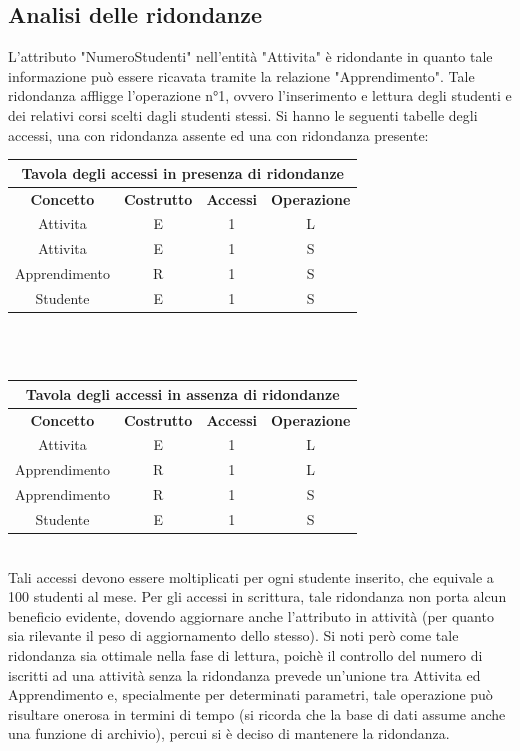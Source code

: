 \documentclass[11pt]{article}
\begin{document}
	\subsection{Analisi delle ridondanze}
		L'attributo "NumeroStudenti" nell'entità "Attivita" è ridondante in quanto tale informazione può essere ricavata tramite la relazione "Apprendimento".
		Tale ridondanza affligge l'operazione n°1, ovvero l'inserimento e lettura degli studenti e dei relativi corsi scelti dagli studenti stessi. Si hanno le seguenti tabelle degli accessi, una con ridondanza assente ed una con ridondanza presente:\\
		\begin{tabular}{|c|c|c|c|}
			\hline
			\multicolumn{4}{|c|}{Tavola degli accessi in presenza di ridondanze}\\
			\hline
			\textbf{Concetto} & \textbf{Costrutto} & \textbf{Accessi} &\textbf{Operazione}\\
			\hline
			Attivita&E&1&L\\
			\hline
			Attivita&E&1&S\\
			\hline
			Apprendimento&R&1&S\\
			\hline
			Studente&E&1&S\\
			\hline
		\end{tabular}\\\\
		\begin{tabular}{|c|c|c|c|}
			\hline
			\multicolumn{4}{|c|}{Tavola degli accessi in assenza di ridondanze}\\
			\hline
			\textbf{Concetto} & \textbf{Costrutto} & \textbf{Accessi} &\textbf{Operazione}\\
			\hline
			Attivita&E&1&L\\
			\hline
			Apprendimento&R&1&L\\
			\hline
			Apprendimento&R&1&S\\
			\hline
			Studente&E&1&S\\
			\hline
		\end{tabular}\\
		Tali accessi devono essere moltiplicati per ogni studente inserito, che equivale a 100 studenti al mese. Per gli accessi in scrittura, tale ridondanza non porta alcun beneficio evidente, dovendo aggiornare anche l'attributo in attività (per quanto sia rilevante il peso di aggiornamento dello stesso). Si noti però come tale ridondanza sia ottimale nella fase di lettura, poichè il controllo del numero di iscritti ad una attività senza la ridondanza prevede un'unione tra Attivita ed Apprendimento e, specialmente per determinati parametri, tale operazione può risultare onerosa in termini di tempo (si ricorda che la base di dati assume anche una funzione di archivio), percui si è deciso di mantenere la ridondanza.
\end{document}
